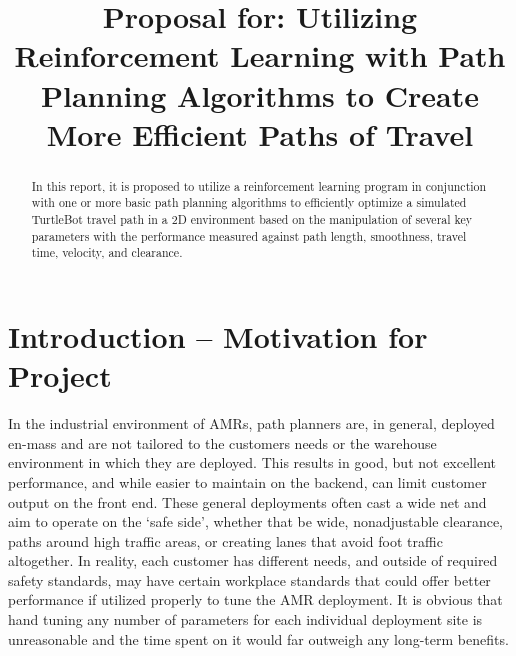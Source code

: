 \documentclass[conference]{IEEEtran}
\begin{document}
\title{Proposal for: Utilizing Reinforcement Learning with Path Planning Algorithms to Create More Efficient Paths of Travel\\
}

\author{
\and
{}
\and
{}
}

\maketitle

\begin{abstract}
In this report, it is proposed to utilize a reinforcement learning program in conjunction with one or more basic path planning algorithms to efficiently optimize a simulated TurtleBot travel path in a 2D environment based on the manipulation of several key parameters with the performance measured against path length, smoothness, travel time, velocity, and clearance.
\end{abstract}


\section{Introduction – Motivation for Project}
In the industrial environment of AMRs, path planners are, in general, deployed en-mass and are not tailored to the customers needs or the warehouse environment in which they are deployed. This results in good, but not excellent performance, and while easier to maintain on the backend, can limit customer output on the front end. These general deployments often cast a wide net and aim to operate on the `safe side', whether that be wide, nonadjustable clearance, paths around high traffic areas, or creating lanes that avoid foot traffic altogether. In reality, each customer has different needs, and outside of required safety standards, may have certain workplace standards that could offer better performance if utilized properly to tune the AMR deployment. It is obvious that hand tuning any number of parameters for each individual deployment site is unreasonable and the time spent on it would far outweigh any long-term benefits.
\end{document}
